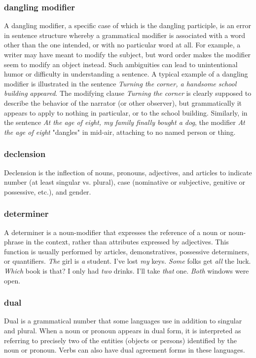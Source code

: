 \begin{small}
\subsubsection{dangling modifier}
A dangling modifier, a specific case of which is the dangling participle, is an error in sentence structure whereby a grammatical modifier is associated with a word other than the one intended, or with no particular word at all. For example, a writer may have meant to modify the subject, but word order makes the modifier seem to modify an object instead. Such ambiguities can lead to unintentional humor or difficulty in understanding a sentence.  A typical example of a dangling modifier is illustrated in the sentence \emph{Turning the corner, a handsome school building appeared}. The modifying clause \emph{Turning the corner} is clearly supposed to describe the behavior of the narrator (or other observer), but grammatically it appears to apply to nothing in particular, or to the school building. Similarly, in the sentence \emph{At the age of eight, my family finally bought a dog}, the modifier \emph{At the age of eight} "dangles" in mid-air, attaching to no named person or thing.

\subsubsection{declension}
Declension is the inflection of nouns, pronouns, adjectives, and articles to indicate number (at least singular vs. plural), case (nominative or subjective, genitive or possessive, etc.), and gender.

\subsubsection{determiner}
A determiner is a noun-modifier that expresses the reference of a noun or noun-phrase in the context, rather than attributes expressed by adjectives. This function is usually performed by articles, demonstratives, possessive determiners, or quantifiers.
\emph{The} girl is \emph{a} student.
I've lost \emph{my} keys.
\emph{Some} folks get \emph{all} the luck.
\emph{Which} book is that?
I only had \emph{two} drinks.
I'll take \emph{that} one.
\emph{Both} windows were open.

\subsubsection{dual }
Dual is a grammatical number that some languages use in addition to singular and plural. When a noun or pronoun appears in dual form, it is interpreted as referring to precisely two of the entities (objects or persons) identified by the noun or pronoun. Verbs can also have dual agreement forms in these languages.

\end{small}
